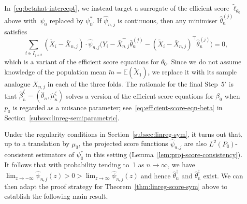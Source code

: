 \documentclass[a4paper]{article}
\newcommand{\E}{\mathbb{E}}
\theoremstyle{definition}
\begin{document}
In~\eqref{eq:betahat-intercept}, we instead target a surrogate of the efficient score $\tilde{\ell}_{\theta_0}$ above with~$\psi_0$ replaced by $\psi_0^*$.  If $\hat{\psi}_{n,j}$ is continuous, then any minimiser $\hat{\theta}_n^{(j)}$ satisfies
\[
\sum_{i \in I_{j+2}} (\tilde{X}_i - \bar{X}_{n,j}) \cdot \hat{\psi}_{n,j}\bigl(Y_i - \bar{X}_{n,j}^\top\bar{\theta}_n^{(j)} - (\tilde{X}_i - \bar{X}_{n,j})^\top\hat{\theta}_n^{(j)}\bigr) = 0,
\]
which is a variant of the efficient score equations for $\theta_0$. Since we do not assume knowledge of the population mean $\tilde{m} = \E(\tilde{X}_1)$, we replace it with its sample analogue $\bar{X}_{n,j}$ in each of the three folds. The rationale for the final Step~$5'$ is that $\hat{\beta}_n^\zeta = (\hat{\theta}_n,\hat{\mu}_n^\zeta)$ solves a version of the efficient score equations for $\beta_0$ when $p_0$ is regarded as a nuisance parameter; see~\eqref{eq:efficient-score-eqn-beta} in Section~\ref{subsec:linreg-semiparametric}.

Under the regularity conditions in Section~\ref{subsec:linreg-sym}, it turns out that, up to a translation by $\mu_0$, the projected score functions $\hat{\psi}_{n,j}$ are also $L^2(P_0)$-consistent estimators of $\psi_0^*$ in this setting (Lemma~\ref{lem:proj-score-consistency}). It follows that with probability tending to~1 as $n \to \infty$, we have $\lim_{z \to -\infty}\hat{\psi}_{n,j}(z) > 0 > \lim_{z \to \infty}\hat{\psi}_{n,j}(z)$ and hence $\hat{\theta}_n^\dagger$ and $\hat{\theta}_n^\ddagger$ exist. We can then adapt the proof strategy for Theorem~\ref{thm:linreg-score-sym} above to establish the following main result.
\end{document}
